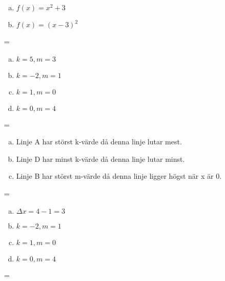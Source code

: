 \documentclass {article}
\newenvironment{absolutelynopagebreak}
  {\par\nobreak\vfil\penalty0\vfilneg
   \vtop\bgroup}
  {\par\xdef\tpd{\the\prevdepth}\egroup
   \prevdepth=\tpd}
\begin{document}
\begin{absolutelynopagebreak}
\begin{enumerate}[a)]
\item $f(x) = x^2 + 3$
\item $f(x) = (x - 3)^2$
\end{enumerate}
\end{absolutelynopagebreak}

\begin{absolutelynopagebreak}
\begin{enumerate}[a)]
\item $k = 5, m = 3$
\item $k = -2, m = 1$
\item $k = 1, m = 0$
\item $k = 0, m = 4$
\end{enumerate}
\end{absolutelynopagebreak}

\begin{absolutelynopagebreak}
\begin{enumerate}[a)]
\item Linje A har störst k-värde då denna linje lutar mest.
\item Linje D har minst k-värde då denna linje lutar minst.
\item Linje B har störst m-värde då denna linje ligger högst när x är 0.
\end{enumerate}
\end{absolutelynopagebreak}

\begin{absolutelynopagebreak}
\begin{enumerate}[a)]
\item $\Delta x = 4 - 1 = 3$
\item $k = -2, m = 1$
\item $k = 1, m = 0$
\item $k = 0, m = 4$
\end{enumerate}
\end{absolutelynopagebreak}
\end{document}

